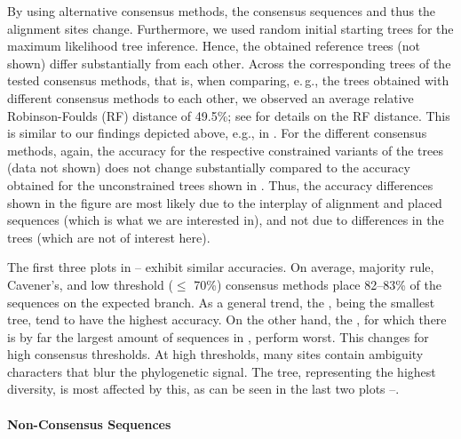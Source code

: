 By using alternative consensus methods, the consensus sequences and thus the alignment sites change.
Furthermore, we used random initial starting trees for the maximum likelihood tree inference.
Hence, the obtained reference trees (not shown) differ substantially from each other.
Across the corresponding trees of the tested consensus methods,
that is, when comparing, e.\,g., the  trees obtained with different consensus methods to each other,
we observed an average relative Robinson-Foulds (RF) distance \citep{Robinson1981} of 49.5\%;
see  for details on the RF distance.
This is similar to our findings depicted above, e.g., in .
For the different consensus methods, again,
the accuracy for the respective constrained variants of the trees (data not shown)
does not change substantially compared to the accuracy obtained for the unconstrained trees shown in .
Thus, the accuracy differences shown in the figure are most likely due to
the interplay of alignment and placed sequences (which is what we are interested in),
and not due to differences in the trees (which are not of interest here).

The first three plots in --
exhibit similar accuracies.
On average, majority rule, Cavener's, and low threshold ($\leq$ 70\%) consensus methods
place 82--83\% of the sequences on the expected branch.
As a general trend, the , being the smallest tree, tend to have the highest accuracy.
On the other hand, the , 
for which there is by far the largest amount of sequences in , perform worst.
This changes for high consensus thresholds. %
At high thresholds, many sites contain ambiguity characters that blur the phylogenetic signal.
The  tree, representing the highest diversity, is most affected by this,
as can be seen in the last two plots 
--.

\paragraph{Non-Consensus Sequences}
\label{ch:AutomaticTrees:sec:Evaluation:sub:Accuracy:par:SingleSequences}

